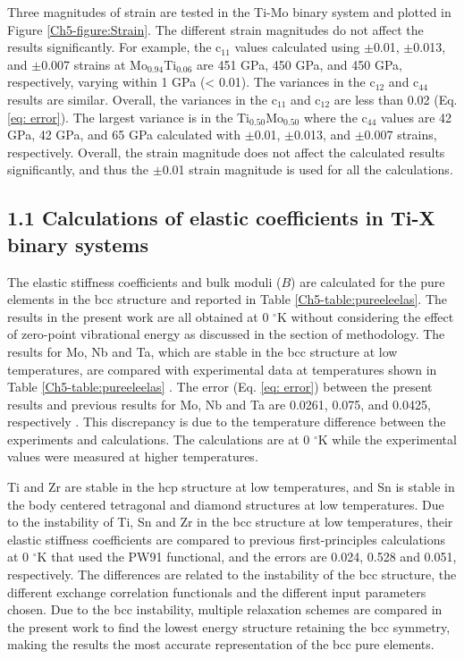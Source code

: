 Three magnitudes of strain are tested in the Ti-Mo binary system and plotted in Figure \ref{Ch5-figure:Strain}. The different strain magnitudes do not affect the results significantly. For example, the c$_{11}$ values calculated using $\pm$0.01, $\pm$0.013, and $\pm$0.007 strains at Mo$_{0.94}$Ti$_{0.06}$ are 451 GPa, 450 GPa, and 450 GPa, respectively, varying within 1 GPa (< 0.01). The variances in the c$_{12}$ and c$_{44}$ results are similar. Overall, the variances in the c$_{11}$ and c$_{12}$ are less than 0.02 (Eq. \ref{eq: error}). The largest variance is in the Ti$_{0.50}$Mo$_{0.50}$ where the c$_{44}$ values are 42 GPa, 42 GPa, and 65 GPa calculated with $\pm$0.01, $\pm$0.013, and $\pm$0.007 strains, respectively. Overall, the strain magnitude does not affect the calculated results significantly, and thus the $\pm$0.01 strain magnitude is used for all the calculations.

\subsection{1.1	Calculations of elastic coefficients in Ti-X binary systems}

The elastic stiffness coefficients and bulk moduli ($B$) are calculated for the pure elements in the bcc structure and reported in Table \ref{Ch5-table:pureeleelas}. The results in the present work are all obtained at 0 $^\circ$K without considering the effect of zero-point vibrational energy as discussed in the section of methodology. The results for Mo, Nb and Ta, which are stable in the bcc structure at low temperatures, are compared with experimental data at temperatures shown in Table \ref{Ch5-table:pureeleelas} \cite{Dickinson1967a,Bolef1961}. The error (Eq. \ref{eq: error}) between the present results and previous results for Mo, Nb and Ta are 0.0261, 0.075, and 0.0425, respectively \cite{Simmons1971b,Dickinson1967a,Bolef1961}. This discrepancy is due to the temperature difference between the experiments and calculations. The calculations are at 0 $^\circ$K while the experimental values were measured at higher temperatures. 

Ti and Zr are stable in the hcp structure at low temperatures, and Sn is stable in the body centered tetragonal and diamond structures at low temperatures. Due to the instability of Ti, Sn and Zr in the bcc structure at low temperatures, their elastic stiffness coefficients are compared to previous first-principles calculations at 0 $^\circ$K \cite{Shang2010b} that used the PW91 functional, and the errors are 0.024, 0.528 and 0.051, respectively. The differences are related to the instability of the bcc structure, the different exchange correlation functionals and the different input parameters chosen. Due to the bcc instability, multiple relaxation schemes are compared in the present work to find the lowest energy structure retaining the bcc symmetry, making the results the most accurate representation of the bcc pure elements.  

